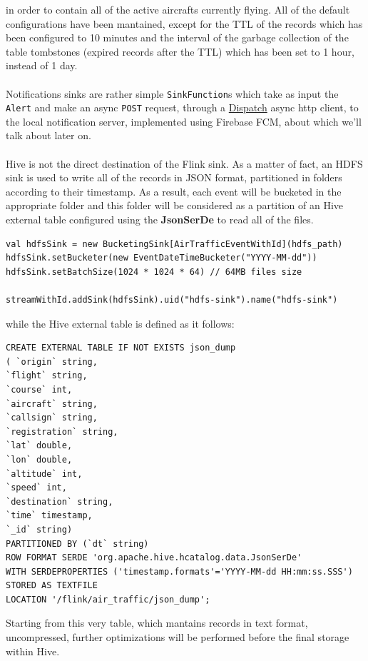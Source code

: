 in order to contain all of the active aircrafts currently flying. All of the default configurations have been mantained, except for the TTL of the records which has been configured to 10 minutes and the interval of the garbage collection of the table tombstones (expired records after the TTL) which has been set to 1 hour, instead of 1 day.
\\\\
Notifications sinks are rather simple \texttt{SinkFunction}s which take as input the \texttt{Alert} and make an async \texttt{POST} request, through a \href{https://dispatchhttp.org/Dispatch.html}{Dispatch} async http client, to the local notification server, implemented using Firebase FCM, about which we'll talk about later on.
\\\\
Hive is not the direct destination of the Flink sink. As a matter of fact, an HDFS sink is used to write all of the records in JSON format, partitioned in folders according to their timestamp. As a result, each event will be bucketed in the appropriate folder and this folder will be considered as a partition of an Hive external table configured using the \textbf{JsonSerDe} to read all of the files.

\begin{verbatim}
val hdfsSink = new BucketingSink[AirTrafficEventWithId](hdfs_path)
hdfsSink.setBucketer(new EventDateTimeBucketer("YYYY-MM-dd"))
hdfsSink.setBatchSize(1024 * 1024 * 64) // 64MB files size

streamWithId.addSink(hdfsSink).uid("hdfs-sink").name("hdfs-sink")
\end{verbatim}

while the Hive external table is defined as it follows:

\begin{verbatim}
CREATE EXTERNAL TABLE IF NOT EXISTS json_dump
( `origin` string,
`flight` string,
`course` int,
`aircraft` string,
`callsign` string,
`registration` string,
`lat` double,
`lon` double,
`altitude` int,
`speed` int,
`destination` string,
`time` timestamp,
`_id` string)
PARTITIONED BY (`dt` string)
ROW FORMAT SERDE 'org.apache.hive.hcatalog.data.JsonSerDe'
WITH SERDEPROPERTIES ('timestamp.formats'='YYYY-MM-dd HH:mm:ss.SSS')
STORED AS TEXTFILE
LOCATION '/flink/air_traffic/json_dump';
\end{verbatim}

Starting from this very table, which mantains records in text format, uncompressed, further optimizations will be performed before the final storage within Hive.

